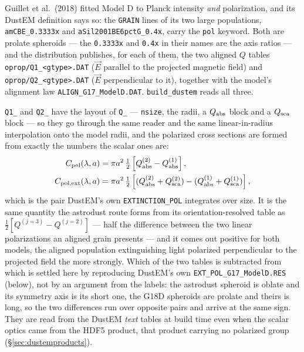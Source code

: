 \documentclass{my_memo}
\newcommand{\code}[1]{\texttt{#1}}
\begin{document}
Guillet et al.\ (2018) fitted Model D to Planck intensity \emph{and}
polarization, and its DustEM definition says so: the \code{GRAIN} lines of its
two large populations, \code{amCBE\_0.3333x} and \code{aSil2001BE6pctG\_0.4x},
carry the \code{pol} keyword. Both are prolate spheroids --- the \code{0.3333x}
and \code{0.4x} in their names are the axis ratios --- and the distribution
publishes, for each of them, the two aligned $Q$ tables
\code{oprop/Q1\_<gtype>.DAT} ($\vec{E}$ parallel to the projected magnetic
field) and \code{oprop/Q2\_<gtype>.DAT} ($\vec{E}$ perpendicular to it),
together with the model's alignment law \code{ALIGN\_G17\_ModelD.DAT}.
\code{build\_dustem} reads all three.

\code{Q1\_} and \code{Q2\_} have the layout of \code{Q\_} --- \code{nsize}, the
radii, a $Q_{\rm abs}$ block and a $Q_{\rm sca}$ block --- so they go through the
same reader and the same linear-in-radius interpolation onto the model radii,
and the polarized cross sections are formed from exactly the numbers the scalar
ones are:
%
\begin{align}
  C_{\rm pol}(\lambda, a)     &= \pi a^2\,
      \tfrac{1}{2}\left[ Q^{(2)}_{\rm abs} - Q^{(1)}_{\rm abs} \right], \\
  C_{\rm pol,ext}(\lambda, a) &= \pi a^2\,
      \tfrac{1}{2}\left[ (Q^{(2)}_{\rm abs} + Q^{(2)}_{\rm sca})
                        -(Q^{(1)}_{\rm abs} + Q^{(1)}_{\rm sca}) \right],
\end{align}
%
which is the pair DustEM's own \code{EXTINCTION\_POL} integrates over size. It
is the same quantity the astrodust route forms from its orientation-resolved
table as $\tfrac{1}{2}[Q^{(j=3)} - Q^{(j=2)}]$ --- half the difference between
the two linear polarizations an aligned grain presents --- and it comes out
positive for both models, the aligned population extinguishing light polarized
perpendicular to the projected field the more strongly. Which of the two
tables is subtracted from which is settled here by reproducing DustEM's own
\code{EXT\_POL\_G17\_ModelD.RES} (below), not by an argument from the labels:
the astrodust spheroid is oblate and its symmetry axis is its short one, the
G18D spheroids are prolate and theirs is long, so the two differences run over
opposite pairs and arrive at the same sign.
They are read from the DustEM \emph{text} tables at build time even when the
scalar optics came from the HDF5 product, that product carrying no polarized
group (\S\ref{sec:dustemproducts}).
\end{document}
